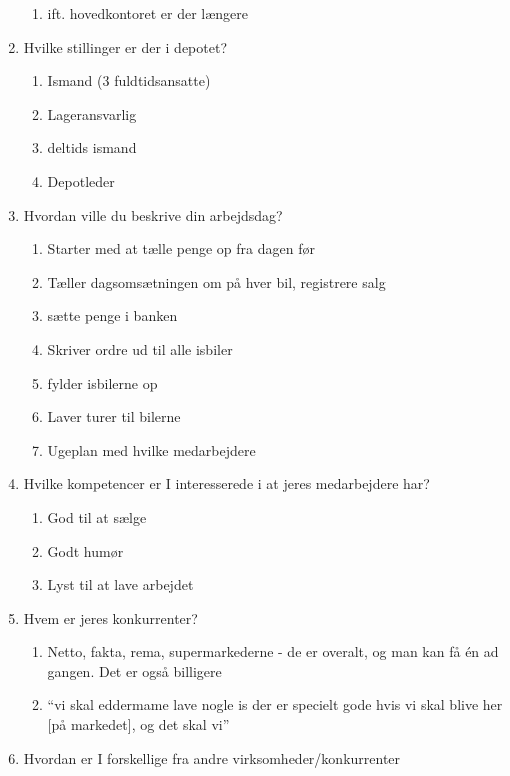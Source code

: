 \begin{enumerate}
\begin{enumerate}
        \item ift. hovedkontoret er der længere
    \end{enumerate}
    \item Hvilke stillinger er der i depotet?
    \begin{enumerate}
        \item Ismand (3 fuldtidsansatte)
        \item Lageransvarlig 
        \item deltids ismand
        \item Depotleder
    \end{enumerate}
    \item Hvordan ville du beskrive din arbejdsdag?
    \begin{enumerate}
        \item Starter med at tælle penge op fra dagen før
        \item Tæller dagsomsætningen om på hver bil, registrere salg
        \item sætte penge i banken
        \item Skriver ordre ud til alle isbiler
        \item fylder isbilerne op
        \item Laver turer til bilerne
        \item Ugeplan med hvilke medarbejdere
    \end{enumerate}
    \item Hvilke kompetencer er I interesserede i at jeres medarbejdere har?
    \begin{enumerate}
        \item God til at sælge
        \item Godt humør
        \item Lyst til at lave arbejdet
    \end{enumerate}
    \item Hvem er jeres konkurrenter?
    \begin{enumerate}
        \item Netto, fakta, rema, supermarkederne - de er overalt, og man kan få én ad gangen. Det er også billigere
        \item “vi skal eddermame lave nogle is der er specielt gode hvis vi skal blive her [på markedet], og det skal vi”
    \end{enumerate}
    \item Hvordan er I forskellige fra andre virksomheder/konkurrenter
    \begin{enumerate}

\end{enumerate}
\end{enumerate}
